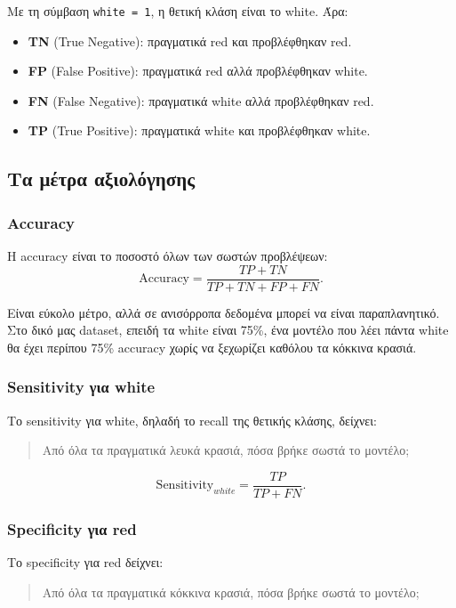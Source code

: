 \documentclass[11pt,a4paper]{article}
\newcommand{\code}[1]{\texttt{#1}}
\newcommand{\eng}[1]{\textenglish{#1}}
\begin{document}
Με τη σύμβαση \code{white = 1}, η θετική κλάση είναι το white. Άρα:
\begin{itemize}
    \item \textbf{TN} (\eng{True Negative}): πραγματικά red και προβλέφθηκαν
    red.
    \item \textbf{FP} (\eng{False Positive}): πραγματικά red αλλά
    προβλέφθηκαν white.
    \item \textbf{FN} (\eng{False Negative}): πραγματικά white αλλά
    προβλέφθηκαν red.
    \item \textbf{TP} (\eng{True Positive}): πραγματικά white και
    προβλέφθηκαν white.
\end{itemize}

\subsection{Τα μέτρα αξιολόγησης}

\subsubsection{Accuracy}

Η accuracy είναι το ποσοστό όλων των σωστών προβλέψεων:
\[
\text{Accuracy} =
\frac{TP + TN}{TP + TN + FP + FN}.
\]

Είναι εύκολο μέτρο, αλλά σε ανισόρροπα δεδομένα μπορεί να είναι
παραπλανητικό. Στο δικό μας dataset, επειδή τα white είναι 75\%, ένα μοντέλο
που λέει πάντα white θα έχει περίπου 75\% accuracy χωρίς να ξεχωρίζει
καθόλου τα κόκκινα κρασιά.

\subsubsection{Sensitivity για white}

Το sensitivity για white, δηλαδή το recall της θετικής κλάσης, δείχνει:
\begin{quote}
Από όλα τα πραγματικά λευκά κρασιά, πόσα βρήκε σωστά το μοντέλο;
\end{quote}

\[
\text{Sensitivity}_{white} =
\frac{TP}{TP + FN}.
\]

\subsubsection{Specificity για red}

Το specificity για red δείχνει:
\begin{quote}
Από όλα τα πραγματικά κόκκινα κρασιά, πόσα βρήκε σωστά το μοντέλο;
\end{quote}
\end{document}
